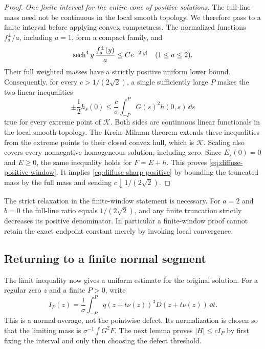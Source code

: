 \begin{proof}
\emph{One finite interval for the entire cone of positive solutions.}
The full-line mass need not be continuous in the local smooth topology.
We therefore pass to a finite interval before applying convex compactness. The
normalized functions $f_a^\pm/a$, including $a=1$, form a compact
family, and
\[
 \operatorname{sech}^4y\,\frac{f_a^\pm(y)}{a}\le C e^{-2|y|}
 \quad(1\le a\le2).
\]
Their full weighted masses have a strictly positive uniform lower
bound. Consequently, for every $c>1/(2\sqrt2)$, a single sufficiently
large $P$ makes the two linear inequalities
\[
 \pm\frac12h_s(0)\le\frac c\sigma
                 \int_{-P}^P G(s)^2h(0,s)\,\dd s
\]
true for every extreme point of $\mathcal K$. Both sides are continuous
linear functionals in the local smooth topology. The Krein--Milman
theorem extends these inequalities from the extreme points to their
closed convex hull, which is $\mathcal K$. Scaling also covers every
nonnegative homogeneous solution, including zero. Since $E_s(0)=0$
and $E\ge0$, the same inequality holds for $F=E+h$.
This proves \eqref{eq:diffuse-positive-window}. It implies
\eqref{eq:diffuse-sharp-positive} by bounding the truncated mass by
the full mass and sending $c\downarrow1/(2\sqrt2)$.
\end{proof}

\begin{remark}\label{rem:diffuse-truncation}
The strict relaxation in the finite-window statement is necessary.
For $a=2$ and $b=0$ the full-line ratio equals $1/(2\sqrt2)$, and any
finite truncation strictly decreases its positive denominator. In
particular a finite-window proof cannot retain the exact endpoint
constant merely by invoking local convergence.
\end{remark}

\subsection{Returning to a finite normal segment}

The limit inequality now gives a uniform estimate for the original
solution. For a regular zero $z$ and a finite $P>0$, write
\begin{equation}\label{eq:diffuse-normal-average}
 I_P(z)=\frac1\sigma\int_{-P}^P
       q(z+t\nu(z))^3D(z+t\nu(z))\,\dd t.
\end{equation}
This is a normal average, not the pointwise defect. Its normalization is
chosen so that the limiting mass is $\sigma^{-1}\int G^2F$.
The next lemma proves $|H|\le cI_P$ by first fixing the interval and
only then choosing the defect threshold.

